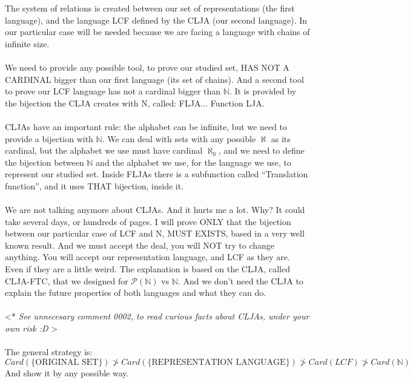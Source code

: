 	\noindent
	The system of relations is created between our set of representations (the first language), and the language LCF defined by the CLJA (our second language). In our particular case will be needed because we are facing a language with chains of infinite size.
	\\\\
	
	\noindent
	We need to provide any possible tool, to prove our studied set, HAS NOT A CARDINAL bigger than our first language (its set of chains). And a second tool to prove our LCF language has not a cardinal bigger than $\mathbb{N}$. It is provided by the bijection the CLJA creates with N, called: FLJA... Function LJA.
	\\\\
	
	\noindent
	CLJAs have an important rule: the alphabet can be infinite, but we need to provide a bijection with $\mathbb{N}$. We can deal with sets with any possible $\aleph$ as its cardinal, but the alphabet we use must have cardinal $\aleph_{0}$, and we need to define the bijection between $\mathbb{N}$ and the alphabet we use, for the language we use, to represent our studied set. Inside FLJAs there is a subfunction called ``Translation function'', and it uses THAT bijection, inside it.
	\\\\
	
	\noindent
	We are not talking anymore about CLJAs. And it hurts me a lot. Why? It could take several days, or hundreds of pages. I will prove ONLY that the bijection between our particular case of LCF and N, MUST EXISTS, based in a very well known result. And we must accept the deal, you will NOT try to change anything. You will accept our representation language, and LCF as they are. Even if they are a little weird. The explanation is based on the CLJA, called CLJA-FTC, that we designed for $\mathcal{P}(\mathbb{N})$ vs $\mathbb{N}$. And we don't need the CLJA to explain the future properties of both languages and what they can do.
	\\\\
	
	\noindent
	\textless ** \textit{See unnecesary comment 0002, to read curious facts about CLJAs, under your own risk :D} \textgreater
	\\\\
	
	\noindent
	The general strategy is:\\
	$$ Card(\{ \text{ORIGINAL SET} \}) \ngtr Card(\{ \text{REPRESENTATION LANGUAGE} \}) \ngtr Card(LCF) \ngtr Card(\mathbb{N}) $$
	And show it by any possible way.
	\\\\
	
